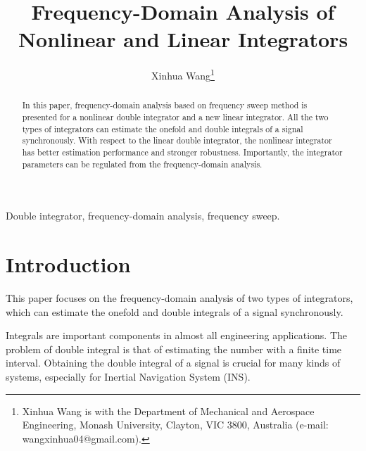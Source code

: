 \documentclass[10pt,journal]{IEEEtran}
\begin{document}
\title{Frequency-Domain Analysis of Nonlinear and Linear Integrators}
\author{Xinhua Wang\thanks{Xinhua Wang is with the Department of Mechanical and Aerospace Engineering,
Monash University, Clayton, VIC 3800, Australia (e-mail:
wangxinhua04@gmail.com).}}
\maketitle

\begin{abstract}
In this paper, frequency-domain analysis based on frequency sweep method is
presented for a nonlinear double integrator and a new linear integrator. All
the two types of integrators can estimate the onefold and double integrals
of a signal synchronously. With respect to the linear double integrator, the
nonlinear integrator has better estimation performance and stronger
robustness. Importantly, the integrator parameters can be regulated from the
frequency-domain analysis.
\end{abstract}

\begin{keywords}
Double integrator, frequency-domain analysis, frequency sweep.
\end{keywords}

\section{Introduction}

\setcounter{page}{1}This paper focuses on the frequency-domain analysis of
two types of integrators, which can estimate the onefold and double
integrals of a signal synchronously.

Integrals are important components in almost all engineering applications.
The problem of double integral is that of estimating the number 
with  a finite time interval. Obtaining the double
integral of a signal is crucial for many kinds of systems, especially for
Inertial Navigation System (INS).
\end{document}
